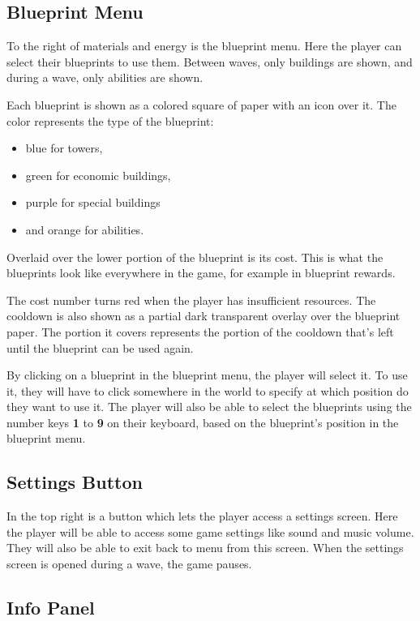 \subsection{Blueprint Menu}

To the right of materials and energy is the blueprint menu.
Here the player can select their blueprints to use them.
Between waves, only buildings are shown, and during a wave, only abilities are shown.

Each blueprint is shown as a colored square of paper with an icon over it.
The color represents the type of the blueprint:
\begin{itemize}
    \item blue for towers,
    \item green for economic buildings,
    \item purple for special buildings
    \item and orange for abilities.
\end{itemize}
Overlaid over the lower portion of the blueprint is its cost.
This is what the blueprints look like everywhere in the game, for example in blueprint rewards.

The cost number turns red when the player has insufficient resources.
The cooldown is also shown as a partial dark transparent overlay over the blueprint paper.
The portion it covers represents the portion of the cooldown that's left until the blueprint can be used again.

By clicking on a blueprint in the blueprint menu, the player will select it.
To use it, they will have to click somewhere in the world to specify at which position do they want to use it.
The player will also be able to select the blueprints using the number keys \textbf{1} to \textbf{9} on their keyboard, based on the blueprint's position in the blueprint menu.

\subsection{Settings Button}

In the top right is a button which lets the player access a settings screen.
Here the player will be able to access some game settings like sound and music volume.
They will also be able to exit back to menu from this screen.
When the settings screen is opened during a wave, the game pauses.

\subsection{Info Panel}\label{sec:design-info-panel}

